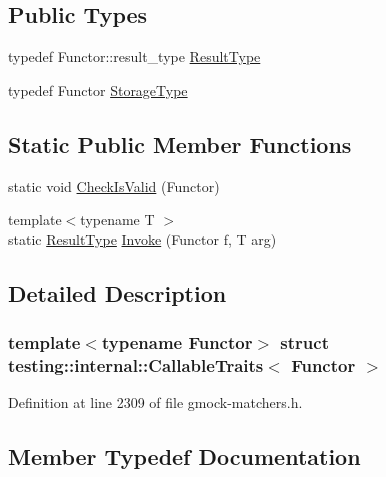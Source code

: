 \subsection*{Public Types}
\begin{DoxyCompactItemize}
\item 
typedef Functor\+::result\+\_\+type \hyperlink{structtesting_1_1internal_1_1CallableTraits_a242d198dd1c56a153ba931d7166ec7f3}{Result\+Type}
\item 
typedef Functor \hyperlink{structtesting_1_1internal_1_1CallableTraits_a23cc0c86a3bd18b2f8dd159dd44e1168}{Storage\+Type}
\end{DoxyCompactItemize}
\subsection*{Static Public Member Functions}
\begin{DoxyCompactItemize}
\item 
static void \hyperlink{structtesting_1_1internal_1_1CallableTraits_ab09a6487235947ec9c5d933d07ac605b}{Check\+Is\+Valid} (Functor)
\item 
{\footnotesize template$<$typename T $>$ }\\static \hyperlink{structtesting_1_1internal_1_1CallableTraits_a242d198dd1c56a153ba931d7166ec7f3}{Result\+Type} \hyperlink{structtesting_1_1internal_1_1CallableTraits_ad54471cad61aefbe15de330867ff5936}{Invoke} (Functor f, T arg)
\end{DoxyCompactItemize}


\subsection{Detailed Description}
\subsubsection*{template$<$typename Functor$>$\newline
struct testing\+::internal\+::\+Callable\+Traits$<$ Functor $>$}



Definition at line 2309 of file gmock-\/matchers.\+h.



\subsection{Member Typedef Documentation}
\mbox{\label{structtesting_1_1internal_1_1CallableTraits_a242d198dd1c56a153ba931d7166ec7f3}} 
